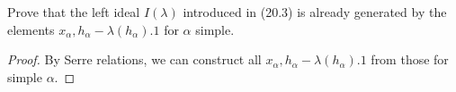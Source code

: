 \begin{ex}
	Prove that the left ideal $I(\lambda)$ introduced in (20.3) is already generated by the elements $x_{\alpha}, h_{\alpha}-\lambda(h_{\alpha}).1$ for $\alpha$ simple.
\end{ex}
\begin{proof}
	By Serre relations, we can construct all $x_{\alpha}, h_{\alpha}-\lambda(h_{\alpha}).1$ from those for simple $\alpha$.
\end{proof}





